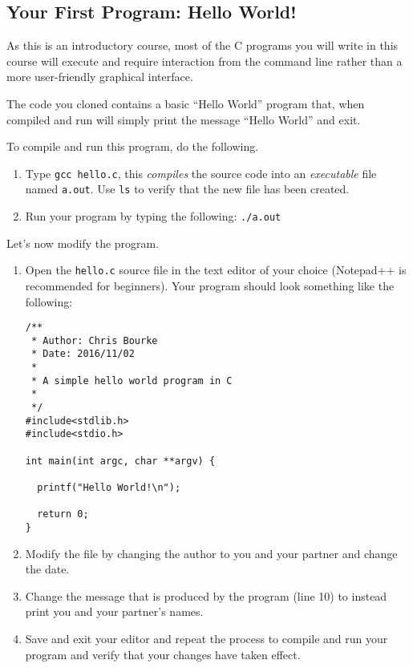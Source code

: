\documentclass[12pt]{scrartcl}
\begin{document}
\subsection{Your First Program: Hello World!}

As this is an introductory course, most of the C programs you will write in 
this course will execute and require interaction from the command line 
rather than a more user-friendly graphical interface.  

The code you cloned contains a basic ``Hello World'' program that, when
compiled and run will simply print the message ``Hello World'' and exit.

To compile and run this program, do the following.
\begin{enumerate}
  \item Type \texttt{gcc hello.c}, this \emph{compiles} the source code
  	into an \emph{executable} file named \texttt{a.out}.  Use 
	\texttt{ls} to verify that the new file has been created.  
  \item Run your program by typing the following: \texttt{./a.out}
\end{enumerate}

Let's now modify the program. 

\begin{enumerate}
  \item Open the \texttt{hello.c} source file in the text editor of
  	your choice (Notepad++ is recommended for beginners).
  	Your program should look something like the following:

\begin{verbatim}
/**
 * Author: Chris Bourke
 * Date: 2016/11/02
 *
 * A simple hello world program in C
 *
 */
#include<stdlib.h>
#include<stdio.h>

int main(int argc, char **argv) {

  printf("Hello World!\n");

  return 0;
}
\end{verbatim}
  \item Modify the file by changing the author to you and your partner and change
  	the date.
  \item Change the message that is produced by the program (line 10) to instead
  	print you and your partner's names.
  \item Save and exit your editor and repeat the process to compile and run
  	your program and verify that your changes have taken effect.
\end{enumerate}
\end{document}
